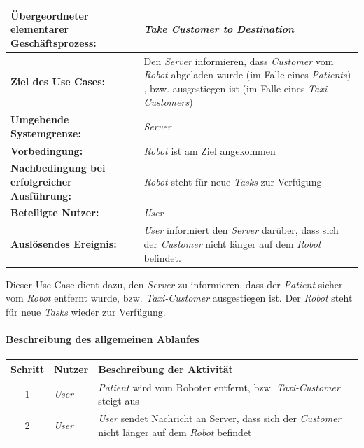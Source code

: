 				\begin{table}[H]
					\centering
					\begin{tabularx}{\textwidth}{|p{5cm}|X|}
						\hline
						\textbf{Übergeordneter elementarer Geschäftsprozess:} & \emph{Take Customer to Destination} \\ \hline
						\textbf{Ziel des Use Cases:} & Den \emph{Server} informieren, dass \emph{Customer} vom \emph{Robot} abgeladen wurde (im Falle eines \emph{Patients}) , bzw. ausgestiegen ist (im Falle eines \emph{Taxi-Customers}) \\ \hline
						\textbf{Umgebende Systemgrenze:} & \emph{Server} \\ \hline
						\textbf{Vorbedingung:} & \emph{Robot} ist am Ziel angekommen \\ \hline
						\textbf{Nachbedingung bei erfolgreicher Ausführung:} & \emph{Robot} steht für neue \emph{Tasks} zur Verfügung \\ \hline
						\textbf{Beteiligte Nutzer:} & \emph{User} \\ \hline
						\textbf{Auslösendes Ereignis:} & \emph{User} informiert den \emph{Server} darüber, dass sich der \emph{Customer} nicht länger auf dem \emph{Robot} befindet. \\
						\hline
					\end{tabularx}
				\end{table}

				Dieser Use Case dient dazu, den \emph{Server} zu informieren, dass der \emph{Patient} sicher vom \emph{Robot} entfernt wurde, bzw. \emph{Taxi-Customer} ausgestiegen ist. Der \emph{Robot} steht für neue \emph{Tasks} wieder zur Verfügung.

				\paragraph*{Beschreibung des allgemeinen Ablaufes}
					\begin{table}[H]
					\centering
					\begin{tabularx}{\textwidth}{|c|p{2cm}|X|}
					\hline
					Schritt & Nutzer & Beschreibung der Aktivität \\ \hline
					1 & \emph{User} & \emph{Patient} wird vom Roboter entfernt, bzw. \emph{Taxi-Customer} steigt aus \\
					2 & \emph{User} & \emph{User} sendet Nachricht an {Server}, dass sich der \emph{Customer} nicht länger auf dem \emph{Robot} befindet \\
					\hline
					\end{tabularx}
				\end{table}

